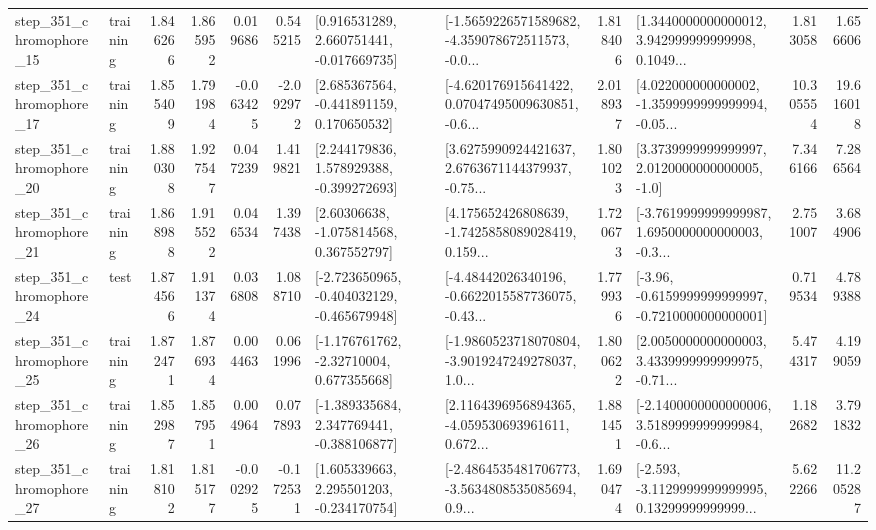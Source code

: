 \begin{tabular}{llrrrrllrlrr}
  step\_351\_chromophore\_15 &  training &      1.846266 &    1.865952 &      0.019686 &  0.545215 &    [0.916531289, 2.660751441, -0.017669735] &  [-1.5659226571589682, -4.359078672511573, -0.0... &       1.818406 &  [1.3440000000000012, 3.942999999999998, 0.1049... &            1.813058 &          1.656606 \\
  step\_351\_chromophore\_17 &  training &      1.855409 &    1.791984 &     -0.063425 & -2.092972 &    [2.685367564, -0.441891159, 0.170650532] &  [-4.620176915641422, 0.07047495009630851, -0.6... &       2.018937 &  [4.022000000000002, -1.3599999999999994, -0.05... &           10.305554 &         19.616018 \\
  step\_351\_chromophore\_20 &  training &      1.880308 &    1.927547 &      0.047239 &  1.419821 &    [2.244179836, 1.578929388, -0.399272693] &  [3.6275990924421637, 2.6763671144379937, -0.75... &       1.801023 &     [3.3739999999999997, 2.0120000000000005, -1.0] &            7.346166 &          7.286564 \\
  step\_351\_chromophore\_21 &  training &      1.868988 &    1.915522 &      0.046534 &  1.397438 &     [2.60306638, -1.075814568, 0.367552797] &  [4.175652426808639, -1.7425858089028419, 0.159... &       1.720673 &  [-3.7619999999999987, 1.6950000000000003, -0.3... &            2.751007 &          3.684906 \\
  step\_351\_chromophore\_24 &      test &      1.874566 &    1.911374 &      0.036808 &  1.088710 &  [-2.723650965, -0.404032129, -0.465679948] &  [-4.48442026340196, -0.6622015587736075, -0.43... &       1.779936 &  [-3.96, -0.6159999999999997, -0.7210000000000001] &            0.719534 &          4.789388 \\
  step\_351\_chromophore\_25 &  training &      1.872471 &    1.876934 &      0.004463 &  0.061996 &    [-1.176761762, -2.32710004, 0.677355668] &  [-1.9860523718070804, -3.9019247249278037, 1.0... &       1.800622 &  [2.0050000000000003, 3.4339999999999975, -0.71... &            5.474317 &          4.199059 \\
  step\_351\_chromophore\_26 &  training &      1.852987 &    1.857951 &      0.004964 &  0.077893 &   [-1.389335684, 2.347769441, -0.388106877] &  [2.1164396956894365, -4.059530693961611, 0.672... &       1.881451 &  [-2.1400000000000006, 3.5189999999999984, -0.6... &            1.182682 &          3.791832 \\
  step\_351\_chromophore\_27 &  training &      1.818102 &    1.815177 &     -0.002925 & -0.172531 &    [1.605339663, 2.295501203, -0.234170754] &  [-2.4864535481706773, -3.5634808535085694, 0.9... &       1.690474 &  [-2.593, -3.1129999999999995, 0.13299999999999... &            5.622266 &         11.205287 \\

\end{tabular}
